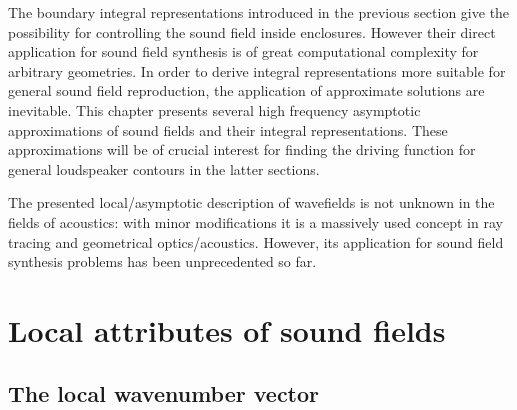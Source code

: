 The boundary integral representations introduced in the previous section give the possibility for controlling the sound field inside enclosures. 
However their direct application for sound field synthesis is of great computational complexity for arbitrary geometries.
In order to derive integral representations more suitable for general sound field reproduction, the application of approximate solutions are inevitable.
This chapter presents several high frequency asymptotic approximations of sound fields and their integral representations.
These approximations will be of crucial interest for finding the driving function for general loudspeaker contours in the latter sections.

The presented local/asymptotic description of wavefields is not unknown in the fields of acoustics: with minor modifications it is a massively used concept in ray tracing and geometrical optics/acoustics.
However, its application for sound field synthesis problems has been unprecedented so far.

\section{Local attributes of sound fields}
\subsection{The local wavenumber vector}

